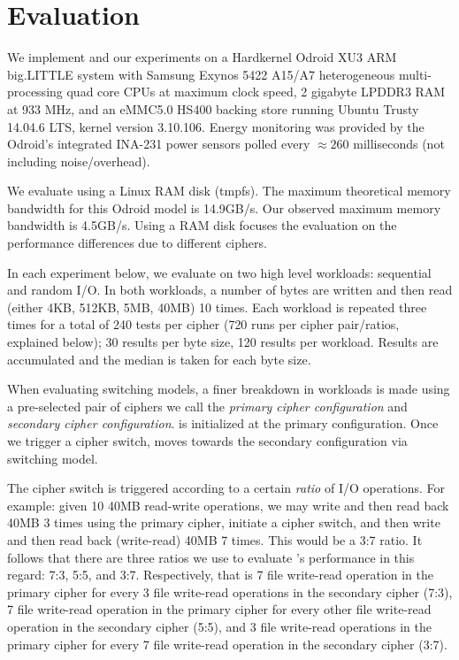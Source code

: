 \section{Evaluation}\label{sec:eval}

We implement \sys and our experiments on a Hardkernel Odroid XU3 ARM big.LITTLE
system with Samsung Exynos 5422 A15/A7 heterogeneous multi-processing quad core
CPUs at maximum clock speed, 2 gigabyte LPDDR3 RAM at 933 MHz, and an eMMC5.0
HS400 backing store running Ubuntu Trusty 14.04.6 LTS, kernel version 3.10.106.
Energy monitoring was provided by the Odroid's integrated INA-231 power sensors
polled every $\approx{260}$ milliseconds (not including noise/overhead).

We evaluate \sys using a Linux RAM disk (tmpfs). The maximum theoretical memory
bandwidth for this Odroid model is 14.9GB/s\@. Our observed maximum memory
bandwidth is 4.5GB/s. Using a RAM disk focuses the evaluation on the performance
differences due to different ciphers.

In each experiment below, we evaluate \sys on two high level workloads:
sequential and random I/O. In both workloads, a number of bytes are written and
then read (either 4KB, 512KB, 5MB, 40MB) 10 times. Each workload is repeated
three times for a total of 240 tests per cipher (720 runs per cipher
pair/ratios, explained below); 30 results per byte size, 120 results per
workload. Results are accumulated and the median is taken for each byte size.

When evaluating switching models, a finer breakdown in workloads is made using a
pre-selected pair of ciphers we call the {\em primary cipher configuration} and
{\em secondary cipher configuration}. \sys is initialized at the primary
configuration. Once we trigger a cipher switch, \sys moves towards the secondary
configuration via switching model.

The cipher switch is triggered according to a certain {\em ratio} of I/O
operations. For example: given 10 40MB read-write operations, we may write and
then read back 40MB 3 times using the primary cipher, initiate a cipher switch,
and then write and then read back (write-read) 40MB 7 times. This would be a 3:7
ratio. It follows that there are three ratios we use to evaluate \sys's
performance in this regard: 7:3, 5:5, and 3:7. Respectively, that is 7 file
write-read operation in the primary cipher for every 3 file write-read
operations in the secondary cipher (7:3), 7 file write-read operation in the
primary cipher for every other file write-read operation in the secondary cipher
(5:5), and 3 file write-read operations in the primary cipher for every 7 file
write-read operation in the secondary cipher (3:7).

